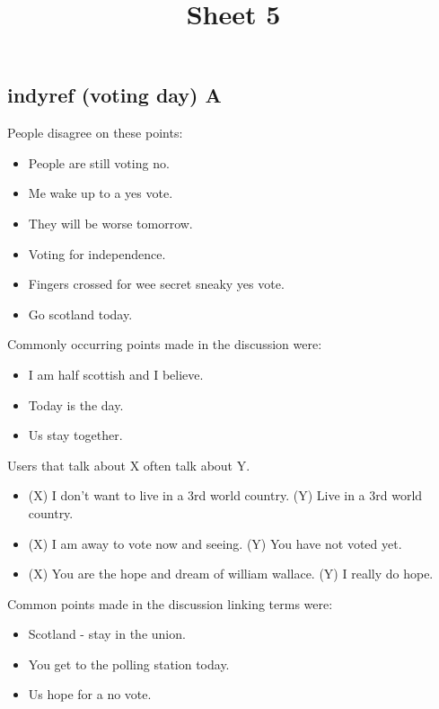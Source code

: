 \documentclass[tikz]{article}
\title{\textbf{Sheet 5}\vspace{-9ex}}
\date{}
\begin{document}
  \maketitle

  \begin{multicols}{2}
    \subsection*{indyref (voting day) A}
    People disagree on these points:
    \begin{itemize}[noitemsep,nolistsep,label={}]
		\item{People are still voting no.}
		\item{Me wake up to a yes vote.}
		\item{They will be worse tomorrow.}
		\item{Voting for independence.}
		\item{Fingers crossed for wee secret sneaky yes vote.}
		\item{Go scotland today.}
    \end{itemize}

    Commonly occurring points made in the discussion were:
    \begin{itemize}[noitemsep,nolistsep,label={}]
		\item{I am half scottish and I believe.}
		\item{Today is the day.}
		\item{Us stay together.}
    \end{itemize}

    Users that talk about X often talk about Y.
    \begin{itemize}[noitemsep,nolistsep,label={}]
		\item{(X) I don't want to live in a 3rd world country. (Y) Live in a 3rd world country.}
		\item{(X) I am away to vote now and seeing. (Y) You have not voted yet.}
		\item{(X) You are the hope and dream of william wallace. (Y) I really do hope.}
    \end{itemize}

    Common points made in the discussion linking terms were:
    \begin{itemize}[noitemsep,nolistsep,label={}]
		\item{Scotland - stay in the union.}
		\item{You get to the polling station today.}
		\item{Us hope for a no vote.}
    \end{itemize}


\end{multicols}
\end{document}
